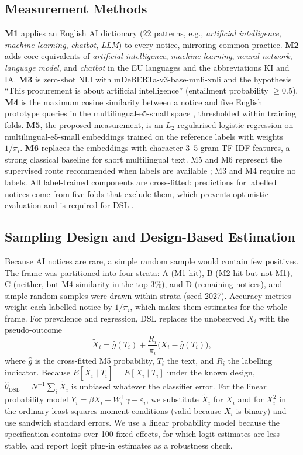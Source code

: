\subsection{Measurement Methods}
\textbf{M1} applies an English AI dictionary (22 patterns, e.g., \textit{artificial intelligence}, \textit{machine learning}, \textit{chatbot}, \textit{LLM}) to every notice, mirroring common practice. \textbf{M2} adds core equivalents of \textit{artificial intelligence}, \textit{machine learning}, \textit{neural network}, \textit{language model}, and \textit{chatbot} in the EU languages and the abbreviations KI and IA. \textbf{M3} is zero-shot NLI with mDeBERTa-v3-base-mnli-xnli \cite{he2023,yin2019} and the hypothesis ``This procurement is about artificial intelligence'' (entailment probability $\ge 0.5$). \textbf{M4} is the maximum cosine similarity between a notice and five English prototype queries in the multilingual-e5-small space \cite{wang2024me5}, thresholded within training folds. \textbf{M5}, the proposed measurement, is an $L_2$-regularised logistic regression on multilingual-e5-small embeddings trained on the reference labels with weights $1/\pi_i$. \textbf{M6} replaces the embeddings with character 3--5-gram TF-IDF features, a strong classical baseline for short multilingual text. M5 and M6 represent the supervised route recommended when labels are available \cite{gentzkow2019}; M3 and M4 require no labels. All label-trained components are cross-fitted: predictions for labelled notices come from five folds that exclude them, which prevents optimistic evaluation and is required for DSL \cite{egami2023}.

\subsection{Sampling Design and Design-Based Estimation}
Because AI notices are rare, a simple random sample would contain few positives. The frame was partitioned into four strata: A (M1 hit), B (M2 hit but not M1), C (neither, but M4 similarity in the top 3\%), and D (remaining notices), and simple random samples were drawn within strata (seed 2027). Accuracy metrics weight each labelled notice by $1/\pi_i$, which makes them estimates for the whole frame. For prevalence and regression, DSL replaces the unobserved $X_i$ with the pseudo-outcome
\begin{equation}
\tilde{X}_i=\hat{g}(T_i)+\frac{R_i}{\pi_i}\bigl(X_i-\hat{g}(T_i)\bigr),
\end{equation}
where $\hat{g}$ is the cross-fitted M5 probability, $T_i$ the text, and $R_i$ the labelling indicator. Because $E[\tilde{X}_i\mid T_i]=E[X_i\mid T_i]$ under the known design, $\hat\theta_{\mathrm{DSL}}=N^{-1}\sum_i\tilde{X}_i$ is unbiased whatever the classifier error. For the linear probability model $Y_i=\beta X_i+W_i^\top\gamma+\varepsilon_i$, we substitute $\tilde{X}_i$ for $X_i$ and for $X_i^2$ in the ordinary least squares moment conditions (valid because $X_i$ is binary) and use sandwich standard errors. We use a linear probability model because the specification contains over 100 fixed effects, for which logit estimates are less stable, and report logit plug-in estimates as a robustness check.
